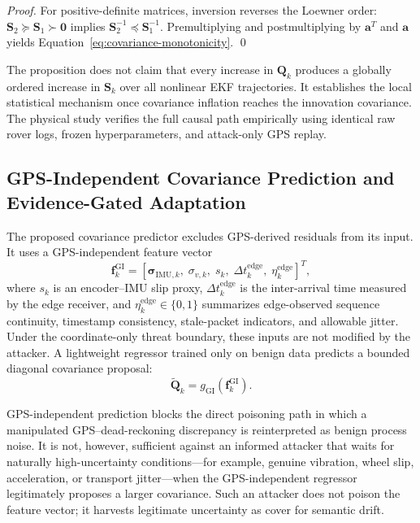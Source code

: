\documentclass[11pt,a4paper]{article}
\begin{document}
\begin{proof}
For positive-definite matrices, inversion reverses the Loewner order: $\mathbf{S}_2\succeq\mathbf{S}_1\succ\mathbf{0}$ implies $\mathbf{S}_2^{-1}\preceq\mathbf{S}_1^{-1}$. Premultiplying and postmultiplying by $\mathbf{a}^{T}$ and $\mathbf{a}$ yields Equation~\eqref{eq:covariance-monotonicity}. \qed
\end{proof}

The proposition does not claim that every increase in $\mathbf{Q}_k$ produces a globally ordered increase in $\mathbf{S}_k$ over all nonlinear EKF trajectories. It establishes the local statistical mechanism once covariance inflation reaches the innovation covariance. The physical study verifies the full causal path empirically using identical raw rover logs, frozen hyperparameters, and attack-only GPS replay.\subsection{GPS-Independent Covariance Prediction and Evidence-Gated Adaptation}
The proposed covariance predictor excludes GPS-derived residuals from its input. It uses a GPS-independent feature vector
\begin{equation}
\mathbf{f}^{\mathrm{GI}}_k=
[\boldsymbol{\sigma}_{\mathrm{IMU},k},\;\sigma_{v,k},\;s_k,\;\Delta t_k^{\mathrm{edge}},\;\eta_k^{\mathrm{edge}}]^T,
\end{equation}
where $s_k$ is an encoder--IMU slip proxy, $\Delta t_k^{\mathrm{edge}}$ is the inter-arrival time measured by the edge receiver, and $\eta_k^{\mathrm{edge}}\in\{0,1\}$ summarizes edge-observed sequence continuity, timestamp consistency, stale-packet indicators, and allowable jitter. Under the coordinate-only threat boundary, these inputs are not modified by the attacker. A lightweight regressor trained only on benign data predicts a bounded diagonal covariance proposal:
\begin{equation}
\widetilde{\mathbf{Q}}_k=g_{\mathrm{GI}}\left(\mathbf{f}^{\mathrm{GI}}_k\right).
\end{equation}

GPS-independent prediction blocks the direct poisoning path in which a manipulated GPS--dead-reckoning discrepancy is reinterpreted as benign process noise. It is not, however, sufficient against an informed attacker that waits for naturally high-uncertainty conditions---for example, genuine vibration, wheel slip, acceleration, or transport jitter---when the GPS-independent regressor legitimately proposes a larger covariance. Such an attacker does not poison the feature vector; it harvests legitimate uncertainty as cover for semantic drift.
\end{document}
